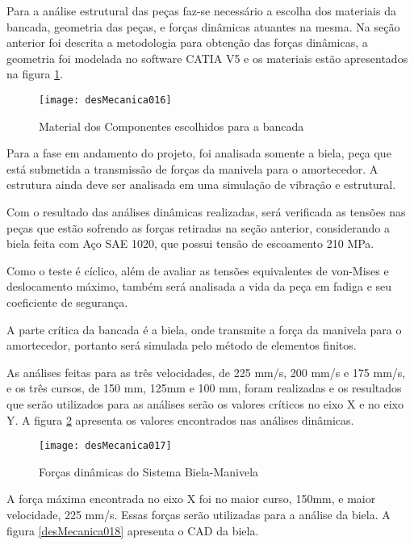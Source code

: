 
		Para a análise estrutural das peças faz-se necessário a escolha dos materiais da bancada, geometria das peças, e forças dinâmicas atuantes na mesma. Na seção anterior foi descrita a metodologia para obtenção das forças dinâmicas, a geometria foi modelada no software CATIA V5 e os materiais estão apresentados na figura \ref{desMecanica016}.

		\begin{figure}[!h]
			\centering
			\texttt{[image: desMecanica016]}
			\caption{Material dos Componentes escolhidos para a bancada}
			\label{desMecanica016}
		\end{figure}

		Para a fase em andamento do projeto, foi analisada somente a biela, peça que está submetida a transmissão de forças da manivela para o amortecedor. A estrutura ainda deve ser analisada em uma simulação de vibração e estrutural.
		
		Com o resultado das análises dinâmicas realizadas, será verificada as tensões nas peças que estão sofrendo as forças retiradas na seção anterior, considerando a biela feita com Aço SAE 1020, que possui tensão de escoamento 210 MPa.
		
		Como o teste é cíclico, além de avaliar as tensões equivalentes de von-Mises e deslocamento máximo, também será analisada a vida da peça em fadiga e seu coeficiente de segurança. 
		
		A parte crítica da bancada é a biela, onde transmite a força da manivela para o amortecedor, portanto será simulada pelo método de elementos finitos. 
		
		As análises feitas para as três velocidades, de 225 mm/s, 200 mm/s e 175 mm/s, e os três cursos, de 150 mm, 125mm e 100 mm, foram realizadas e os resultados que serão utilizados para as análises serão os valores críticos no eixo X e no eixo Y. A figura \ref{desMecanica017} apresenta os valores encontrados nas análises dinâmicas.

		\begin{figure}[!h]
			\centering
			\texttt{[image: desMecanica017]}
			\caption{Forças dinâmicas do Sistema Biela-Manivela}
			\label{desMecanica017}
		\end{figure}

		A força máxima encontrada no eixo X foi no maior curso, 150mm, e maior velocidade, 225 mm/s. Essas forças serão utilizadas para a análise da biela. A figura \ref{desMecanica018} apresenta o CAD da biela.

